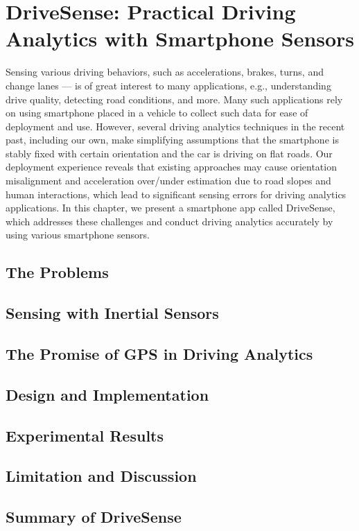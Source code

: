 
\chapter{DriveSense: Practical Driving Analytics with Smartphone Sensors} 
\label{chapter_drivesense}

Sensing various driving behaviors, such as accelerations, brakes,
turns, and change lanes — is of great interest to many applications,
e.g., understanding drive quality, detecting road conditions, and
more. Many such applications rely on using smartphone placed in a
vehicle to collect such data for ease of deployment and use. However,
several driving analytics techniques in the recent past, including
our own, make simplifying assumptions that the smartphone is
stably fixed with certain orientation and the car is driving on flat
roads. Our deployment experience reveals that existing approaches
may cause orientation misalignment and acceleration over/under
estimation due to road slopes and human interactions, which lead
to significant sensing errors for driving analytics applications.
In this chapter, we present a smartphone app called DriveSense,
which addresses these challenges and conduct driving analytics
accurately by using various smartphone sensors.  


\section{The Problems}



\section{Sensing with Inertial Sensors}
\label{imusensors}



\section{The Promise of GPS in Driving Analytics}
\label{gps}



\section{Design and Implementation}
\label{design_implement}


\section{Experimental Results}
\label{evaluation}



\section{Limitation and Discussion}




\section{Summary of DriveSense}






